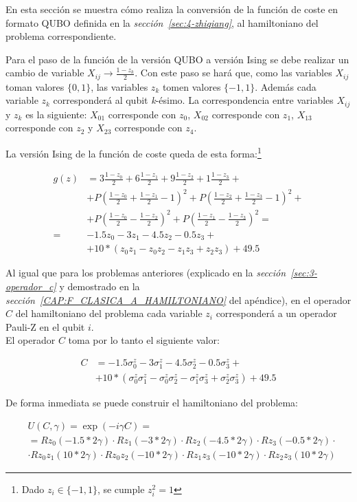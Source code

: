 En esta sección se muestra cómo realiza la conversión de la función de coste en formato QUBO definida en la \textit{sección~\ref{sec:4-zhiqiang}}, al hamiltoniano del problema correspondiente.

Para el paso de la función de la versión QUBO a versión Ising se debe realizar un cambio de variable $X_{ij} \rightarrow \frac{1 - z_k}{2}$.
Con este paso se hará que, como las variables $X_{ij}$ toman valores $\{0, 1\}$, las variables $z_k$ tomen valores $\{-1, 1\}$.
Además cada variable $z_k$ corresponderá al qubit \textit{k}-ésimo.
La correspondencia entre variables $X_{ij}$ y $z_k$ es la siguiente:
$X_{01}$ corresponde con $z_0$,
$X_{02}$ corresponde con $z_1$,
$X_{13}$ corresponde con $z_2$ y
$X_{23}$ corresponde con $z_4$.

La versión Ising de la función de coste queda de esta forma:\footnote{Dado $z_i \in \{-1, 1\}$, se cumple $z_i^2 = 1$}

\begin{align}
  g(z) &= 3\frac{1 - z_0}{2} + 6\frac{1 - z_1}{2} + 9\frac{1 - z_2}{2} + 1\frac{1 - z_3}{2} + \nonumber \\
       &+ P{(\frac{1 - z_0}{2} + \frac{1 - z_1}{2} - 1)}^2 + P{(\frac{1 - z_2}{2} + \frac{1 - z_3}{2} - 1)}^2 + \nonumber \\
       &+ P{(\frac{1 - z_0}{2} - \frac{1 - z_2}{2})}^2 + P{(\frac{1 - z_1}{2} - \frac{1 - z_3}{2})}^2 = \nonumber \\
  = &  -1.5z_0 - 3z_1 - 4.5z_2 - 0.5z_3 + \nonumber \\
       &+ 10*(z_0z_1 - z_0z_2 - z_1z_3 + z_2z_3) + 49.5
\end{align}

Al igual que para los problemas anteriores (explicado en la \textit{sección~\ref{sec:3-operador_c}} y demostrado en la \textit{sección~\ref{CAP:F_CLASICA_A_HAMILTONIANO}} del apéndice), en el operador $C$ del hamiltoniano del problema cada variable $z_i$ corresponderá a un operador Pauli-Z en el qubit $i$.
\\
El operador $C$ toma por lo tanto el siguiente valor:

\begin{align}
  C &= -1.5\sigma^z_0 - 3\sigma^z_1 - 4.5\sigma^z_2 - 0.5\sigma^z_3 + \nonumber \\
    &+ 10*(\sigma^z_0\sigma^z_1 - \sigma^z_0\sigma^z_2 - \sigma^z_1\sigma^z_3 + \sigma^z_2\sigma^z_3) + 49.5
\end{align}

De forma inmediata se puede construir el hamiltoniano del problema:

\begin{align}
  &U(C, \gamma) = \exp(-i \gamma C) = \nonumber \\
  &= Rz_0(-1.5 * 2\gamma) \cdot Rz_1(-3 * 2\gamma) \cdot Rz_2(-4.5 * 2\gamma) \cdot Rz_3(-0.5 * 2\gamma) \cdot \nonumber \\
  &\cdot Rz_0z_1(10 * 2\gamma) \cdot Rz_0z_2(-10 * 2\gamma) \cdot Rz_1z_3(-10 * 2\gamma) \cdot Rz_2z_3(10 * 2\gamma)
\end{align}


